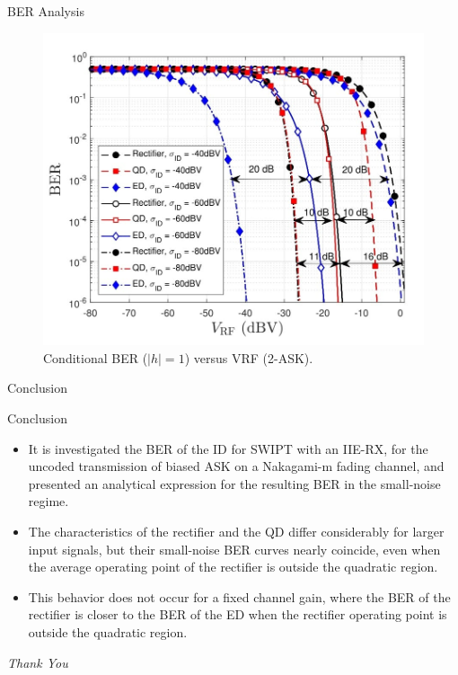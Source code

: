 \documentclass{beamer}
\begin{document}
\begin{section}{BER Analysis}
\begin{frame}
    \begin{figure}[t]
        \centering
         \includegraphics[scale=0.3]{Images/Picture5.jpg}
         \caption{ Conditional BER ($|h| = 1$) versus VRF (2-ASK).}
        \label{fig:my_label5}
        \end{figure}
\end{frame}
\end{section}
\begin{section}{Conclusion}
    \begin{frame}{Conclusion}
    \begin{itemize}
        \item It is investigated the BER of the ID for SWIPT with an IIE-RX, for the uncoded transmission of biased ASK on a Nakagami-m fading channel, and presented an analytical expression for the resulting BER in the small-noise regime.
        \item The characteristics of the rectifier and the QD differ considerably for larger input signals, but their small-noise BER curves nearly coincide, even when the average operating point of the rectifier is outside the quadratic region.
        \item This behavior does not occur for a fixed channel gain, where the BER of the rectifier is closer to the BER of the ED when the rectifier operating point is outside the quadratic region.
    \end{itemize}
\end{frame}
\end{section}
\begin{frame}
    \centering  \Huge
    \emph{ Thank You}\\
    \vspace{2cm}
    \large
\end{frame}
\end{document}
